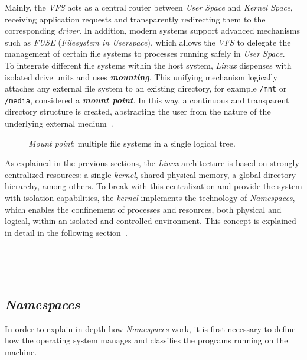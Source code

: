 Mainly, the \textit{VFS} acts as a central router between \textit{User Space} and \textit{Kernel Space}, receiving application requests and transparently redirecting them to the corresponding \textit{driver}.
In addition, modern systems support advanced mechanisms such as \textit{FUSE} (\textit{Filesystem in Userspace}), which allows the \textit{VFS} to delegate the management of certain file systems to processes running safely in \textit{User Space}.\\

To integrate different file systems within the host system, \textit{Linux} dispenses with isolated drive units and uses \textbf{\textit{mounting}}.
This unifying mechanism logically attaches any external file system to an existing directory, for example \texttt{/mnt} or \texttt{/media}, considered a \textbf{\textit{mount point}}.
In this way, a continuous and transparent directory structure is created, abstracting the user from the nature of the underlying external medium~\cite{love_linux}.\\

\begin{figure}[h!]
  \centering
  \scalebox{0.8}{}
  \caption{\textit{Mount point}: multiple file systems in a single logical tree.}
  \label{fig:mounting_point}
\end{figure}

As explained in the previous sections, the \textit{Linux} architecture is based on strongly centralized resources: a single \textit{kernel}, shared physical memory, a global directory hierarchy, among others.
To break with this centralization and provide the system with isolation capabilities, the \textit{kernel} implements the technology of \textit{Namespaces}, which enables the confinement of processes and resources, both physical and logical, within an isolated and controlled environment.
This concept is explained in detail in the following section~\cite{librossoo, love_linux}.

\

\

\subsection{\textit{Namespaces}}
\label{sec:namespaces}

In order to explain in depth how \textit{Namespaces} work, it is first necessary to define how the operating system manages and classifies the programs running on the machine.\\

